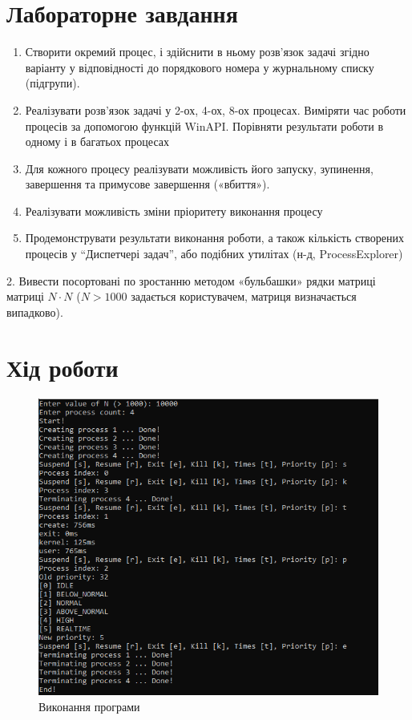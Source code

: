 \documentclass{article}
\begin{document}
\begin{normalsize}
	\section*{Лабораторне завдання}
	\begin{enumerate}
		\item Створити окремий процес, і здійснити в ньому розв’язок задачі
		згідно варіанту у відповідності до порядкового номера у
		журнальному списку (підгрупи).
		\item Реалізувати розв’язок задачі у 2-ох, 4-ох, 8-ох процесах. Виміряти
		час роботи процесів за допомогою функцій WinAPI. Порівняти
		результати роботи в одному і в багатьох процесах
		\item Для кожного процесу реалізувати можливість його запуску,
		зупинення, завершення та примусове завершення («вбиття»).
		\item Реалізувати можливість зміни пріоритету виконання процесу
		\item Продемонструвати результати виконання роботи, а також кількість
		створених процесів у “Диспетчері задач”, або подібних утилітах (н-д,
		ProcessExplorer)
	\end{enumerate}
	\begin{center}
		2. Вивести посортовані по зростанню методом «бульбашки» рядки
		матриці матриці $N\cdot N$ ($N>1000$ задається користувачем, матриця
		визначається випадково).
	\end{center}

	\section*{Хід роботи}	
	\begin{figure}[H]
		\centering
		\includegraphics[scale=0.7]{v}
		\caption{Виконання програми}
	\end{figure}
	

\end{normalsize}
\end{document}
